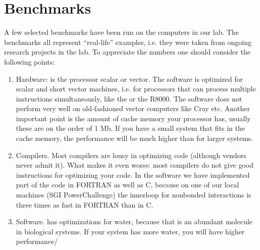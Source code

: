 \section{Benchmarks}
A few selected benchmarks have been run on the computers in our lab.
The benchmarks all represent ``real-life'' examples, i.e. they
were taken from ongoing research projects in the lab. To appreciate
the numbers one should consider the following points:
\begin{enumerate}
\item	Hardware: is the processor scalar or vector. The {\gromacs}
	software is optimized for scalar and short vector machines,
	i.e. for processors that can process multiple instructions
	simultaneously, like the {\intel} or the R8000. The software
	does not perform very well on old-fashioned vector computers
	like Cray etc. Another important point is the amount
	of cache memory your processor has, usually these are on the
	order of 1 Mb. If you have a small system that fits in the cache
	memory, the performance will be much higher than for larger
	systems.
\item	Compilers. Most compilers are lousy in optimizing code (although
	vendors never admit it). What makes it even worse: most compilers
	do not give good instructions for optimizing your code.
	In the {\gromacs} software we have implemented part of the code
	in FORTRAN as well as C, because on one of our local machines
	(SGI PowerChallenge) the innerloop for nonbonded interactions
	is three times as fast in FORTRAN than in C.
\item	Software. {\gromacs} has optimizations for water, because that is
	an abundant molecule in biological systems. If your system has more
	water, you will have higher performance/
\end{enumerate}


